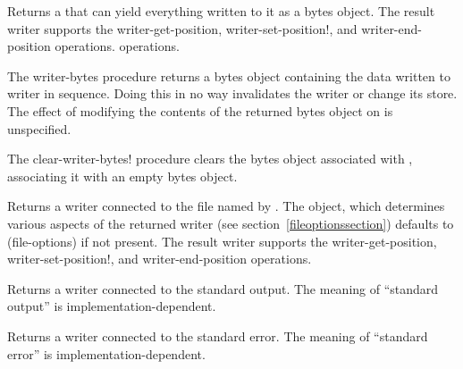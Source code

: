 \begin{entry}{%
}
   
Returns a  that can yield everything written to it as
a bytes object. The result writer supports the {\cf writer-get-position},
{\cf writer-set-position!}, and {\cf writer-end-position} operations.
operations.
\end{entry}

\begin{entry}{%
}
   
The {\cf writer-bytes} procedure
returns a bytes object containing the data written to
writer in sequence. Doing this in no way invalidates the writer or
change its store.
The effect of modifying the contents of the returned bytes object
on  is unspecified.
\end{entry}

\begin{entry}{%
}

The {\cf clear-writer-bytes!} 
procedure clears the bytes object associated with ,
associating it with an empty bytes object.
\end{entry}

\begin{entry}{%
}
   
Returns a writer connected to the file named by .
The  object, which determines various aspects of the returned writer
(see section~\ref{fileoptionssection})
defaults to {\cf (file-options)} if not
present. The result writer supports the {\cf writer-get-position},
{\cf writer-set-position!}, and {\cf writer-end-position} operations.
\end{entry}

\begin{entry}{%
}
   
Returns a writer connected to the standard output. The meaning of
``standard output'' is implementation-dependent.
\end{entry}

\begin{entry}{%
}
   
Returns a writer connected to the standard error. The meaning of
``standard error'' is implementation-dependent.
\end{entry}   

